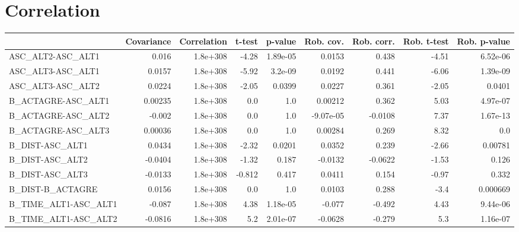 \section{Correlation}
\begin{tabular}{lrrrrrrrr}
\toprule
{} &  Covariance &  Correlation &  t-test &  p-value &  Rob. cov. &  Rob. corr. &  Rob. t-test &  Rob. p-value \\
\midrule
ASC\_ALT2-ASC\_ALT1                 &       0.016 &     1.8e+308 &   -4.28 & 1.89e-05 &     0.0153 &       0.438 &        -4.51 &      6.52e-06 \\
ASC\_ALT3-ASC\_ALT1                 &      0.0157 &     1.8e+308 &   -5.92 &  3.2e-09 &     0.0192 &       0.441 &        -6.06 &      1.39e-09 \\
ASC\_ALT3-ASC\_ALT2                 &      0.0224 &     1.8e+308 &   -2.05 &   0.0399 &     0.0227 &       0.361 &        -2.05 &        0.0401 \\
B\_ACTAGRE-ASC\_ALT1                &     0.00235 &     1.8e+308 &     0.0 &      1.0 &    0.00212 &       0.362 &         5.03 &      4.97e-07 \\
B\_ACTAGRE-ASC\_ALT2                &      -0.002 &     1.8e+308 &     0.0 &      1.0 &  -9.07e-05 &     -0.0108 &         7.37 &      1.67e-13 \\
B\_ACTAGRE-ASC\_ALT3                &     0.00036 &     1.8e+308 &     0.0 &      1.0 &    0.00284 &       0.269 &         8.32 &           0.0 \\
B\_DIST-ASC\_ALT1                   &      0.0434 &     1.8e+308 &   -2.32 &   0.0201 &     0.0352 &       0.239 &        -2.66 &       0.00781 \\
B\_DIST-ASC\_ALT2                   &     -0.0404 &     1.8e+308 &   -1.32 &    0.187 &    -0.0132 &     -0.0622 &        -1.53 &         0.126 \\
B\_DIST-ASC\_ALT3                   &     -0.0133 &     1.8e+308 &  -0.812 &    0.417 &     0.0411 &       0.154 &        -0.97 &         0.332 \\
B\_DIST-B\_ACTAGRE                  &      0.0156 &     1.8e+308 &     0.0 &      1.0 &     0.0103 &       0.288 &         -3.4 &      0.000669 \\
B\_TIME\_ALT1-ASC\_ALT1              &      -0.087 &     1.8e+308 &    4.38 & 1.18e-05 &     -0.077 &      -0.492 &         4.43 &      9.44e-06 \\
B\_TIME\_ALT1-ASC\_ALT2              &     -0.0816 &     1.8e+308 &     5.2 & 2.01e-07 &    -0.0628 &      -0.279 &          5.3 &      1.16e-07 \\

\end{tabular}
